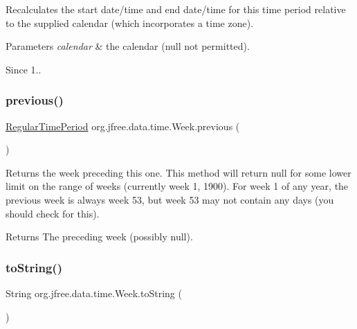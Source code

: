 Recalculates the start date/time and end date/time for this time period relative to the supplied calendar (which incorporates a time zone).


\begin{DoxyParams}{Parameters}
{\em calendar} & the calendar ({\ttfamily null} not permitted).\\
\hline
\end{DoxyParams}
\begin{DoxySince}{Since}
1.. 
\end{DoxySince}
\mbox{\label{classorg_1_1jfree_1_1data_1_1time_1_1_week_a08358ec4b2cd6b564a349db9e223e3c7}} 
\subsubsection{\texorpdfstring{previous()}{previous()}}
{\footnotesize\ttfamily \mbox{\hyperlink{classorg_1_1jfree_1_1data_1_1time_1_1_regular_time_period}{Regular\+Time\+Period}} org.\+jfree.\+data.\+time.\+Week.\+previous (\begin{DoxyParamCaption}{ }\end{DoxyParamCaption})}

Returns the week preceding this one. This method will return {\ttfamily null} for some lower limit on the range of weeks (currently week 1, 1900). For week 1 of any year, the previous week is always week 53, but week 53 may not contain any days (you should check for this).

\begin{DoxyReturn}{Returns}
The preceding week (possibly {\ttfamily null}). 
\end{DoxyReturn}
\mbox{\label{classorg_1_1jfree_1_1data_1_1time_1_1_week_af414f72d4a4e6edd490c0da3e6d4719a}} 
\subsubsection{\texorpdfstring{to\+String()}{toString()}}
{\footnotesize\ttfamily String org.\+jfree.\+data.\+time.\+Week.\+to\+String (\begin{DoxyParamCaption}{ }\end{DoxyParamCaption})}

